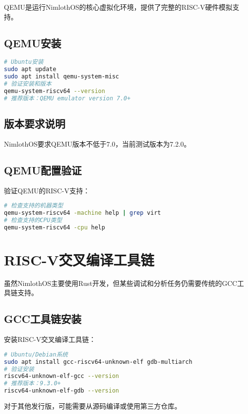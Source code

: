 QEMU是运行NimlothOS的核心虚拟化环境，提供了完整的RISC-V硬件模拟支持。

\subsection{QEMU安装}

\begin{lstlisting}[language=bash]
# Ubuntu安装
sudo apt update
sudo apt install qemu-system-misc
# 验证安装和版本
qemu-system-riscv64 --version
# 推荐版本：QEMU emulator version 7.0+
\end{lstlisting}

\subsection{版本要求说明}

NimlothOS要求QEMU版本不低于7.0，当前测试版本为7.2.0。

\subsection{QEMU配置验证}

验证QEMU的RISC-V支持：

\begin{lstlisting}[language=bash]
# 检查支持的机器类型
qemu-system-riscv64 -machine help | grep virt
# 检查支持的CPU类型
qemu-system-riscv64 -cpu help
\end{lstlisting}

\section{RISC-V交叉编译工具链}

虽然NimlothOS主要使用Rust开发，但某些调试和分析任务仍需要传统的GCC工具链支持。

\subsection{GCC工具链安装}

安装RISC-V交叉编译工具链：

\begin{lstlisting}[language=bash]
# Ubuntu/Debian系统
sudo apt install gcc-riscv64-unknown-elf gdb-multiarch
# 验证安装
riscv64-unknown-elf-gcc --version
# 推荐版本：9.3.0+
riscv64-unknown-elf-gdb --version
\end{lstlisting}

对于其他发行版，可能需要从源码编译或使用第三方仓库。

